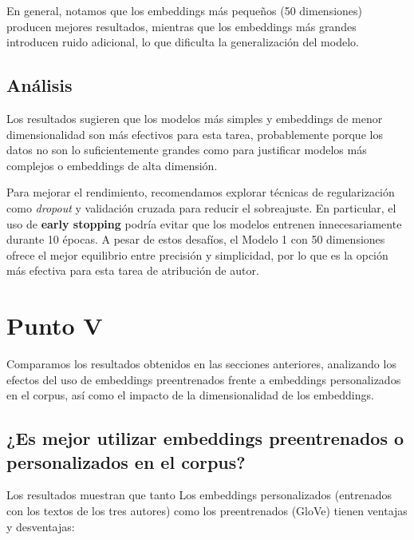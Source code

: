 \documentclass[11pt,english]{article}
\theoremstyle{plain}
\begin{document}
En general, notamos que los embeddings más pequeños (50 dimensiones) producen mejores resultados, mientras que los embeddings más grandes introducen ruido adicional, lo que dificulta la generalización del modelo.

\subsection*{Análisis}

Los resultados sugieren que los modelos más simples y embeddings de menor dimensionalidad son más efectivos para esta tarea, probablemente porque los datos no son lo suficientemente grandes como para justificar modelos más complejos o embeddings de alta dimensión. 

Para mejorar el rendimiento, recomendamos explorar técnicas de regularización como \textit{dropout} y validación cruzada para reducir el sobreajuste. En particular, el uso de \textbf{early stopping} podría evitar que los modelos entrenen innecesariamente durante 10 épocas. A pesar de estos desafíos, el Modelo 1 con 50 dimensiones ofrece el mejor equilibrio entre precisión y simplicidad, por lo que es la opción más efectiva para esta tarea de atribución de autor.

\section*{Punto V}

Comparamos los resultados obtenidos en las secciones anteriores, analizando los efectos del uso de embeddings preentrenados frente a embeddings personalizados en el corpus, así como el impacto de la dimensionalidad de los embeddings.

\subsection*{¿Es mejor utilizar embeddings preentrenados o personalizados en el corpus?}

Los resultados muestran que tanto Los embeddings personalizados (entrenados con los textos de los tres autores) como los preentrenados (GloVe) tienen ventajas y desventajas:
\end{document}
